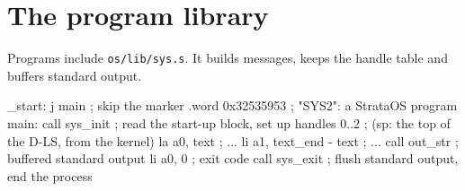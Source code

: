 \section{The program library}\label{sec:os-lib}

Programs include \texttt{os/lib/sys.s}. It builds messages, keeps the handle table and buffers
standard output.

\begin{asm}
_start: j     main                      ; skip the marker
        .word 0x32535953                ; "SYS2": a StrataOS program
main:   call  sys_init                  ; read the start-up block, set up handles 0..2
                                        ; (sp: the top of the D-LS, from the kernel)
        la    a0, text                  ; ...
        li    a1, text_end - text       ; ...
        call  out_str                   ; buffered standard output
        li    a0, 0                     ; exit code
        call  sys_exit                  ; flush standard output, end the process
\end{asm}


